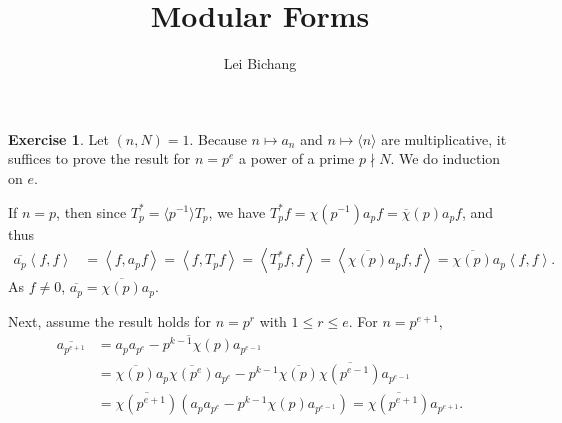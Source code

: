 \documentclass{article}
\title{Modular Forms}
\author{Lei Bichang}
\date{}
\theoremstyle{definition}
\newtheorem{example}{Exercise}
\theoremstyle{remark}
\newcommand{\gene}[1]{\left\langle #1 \right\rangle} %
\begin{document}
\maketitle

\begin{example}
Let $(n, N) = 1$.
Because $n\mapsto a_n$ and $n\mapsto \langle n\rangle$ are multiplicative, it suffices to prove the result for $n = p^e$ a power of a prime $p\nmid N$. We do induction on $e$.

If $n = p$, then since $T_p^* = \langle p^{-1}\rangle T_p$, we have $T_p^*f = \chi(p^{-1})a_pf = \overline{\chi}(p)a_pf$, and thus\begin{align*}
    \overline{a_p}\gene{f, f} &= \gene{f, a_pf}
    = \gene{f, T_pf} = \gene{T_p^*f, f}
    =\gene{\overline{\chi(p)}a_pf, f} = \overline{\chi(p)}a_p\gene{f, f}.
\end{align*}
As $f\ne 0$, $\overline{a_p} = \overline{\chi(p)} a_p$.

Next, assume the result holds for $n = p^r$ with $1\le r \le e$.
For $n = p^{e+1}$,
\begin{align*}
    \overline{a_{p^{e+1}}} &= \overline{a_pa_{p^{e}} - p^{k-1}\chi(p)a_{p^{e-1}} }
    \\ &= \overline{\chi(p)} a_p\overline{\chi(p^e)}a_{p^e}
    - p^{k-1}\overline{\chi(p)}\overline{\chi(p^{e-1})}a_{p^{e-1}}\\ 
    &= \overline{\chi(p^{e+1})} \left( a_pa_{p^e} - p^{k-1}\chi(p)a_{p^{e-1}} \right) = \overline{\chi(p^{e+1})}a_{p^{e+1}}.
\end{align*}


\end{example}
\end{document}
